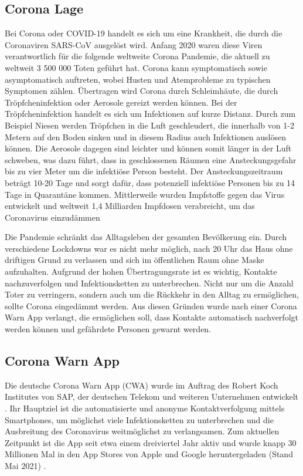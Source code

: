 \documentclass[conference]{IEEEtran}
\begin{document}
\subsection{Corona Lage}
Bei Corona oder COVID-19 handelt es sich um eine Krankheit, die durch die Coronaviren SARS-CoV ausgelöst wird. 
Anfang 2020 waren diese Viren verantwortlich für die folgende weltweite Corona Pandemie, die aktuell zu weltweit 3 500 000 Toten geführt hat. 
Corona kann symptomatisch sowie asymptomatisch auftreten, wobei Husten und Atemprobleme zu typischen Symptomen zählen.
Übertragen wird Corona durch Schleimhäute, die durch Tröpfcheninfektion oder Aerosole gereizt werden können.
Bei der Tröpfcheninfektion handelt es sich um Infektionen auf kurze Distanz. Durch zum Beispiel Niesen werden Tröpfchen in die Luft geschleudert, 
die innerhalb von 1-2 Metern auf den Boden sinken und in diesem Radius auch Infektionen auslösen können. 
Die Aerosole dagegen sind leichter und können somit länger in der Luft schweben, 
was dazu führt, dass in geschlossenen Räumen eine Ansteckungsgefahr bis zu vier Meter um die infektiöse Person besteht. 
Der Ansteckungszeitraum beträgt 10-20 Tage und sorgt dafür, dass potenziell infektiöse Personen bis zu 14 Tage in Quarantäne kommen.
Mittlerweile wurden Impfstoffe gegen das Virus entwickelt und weltweit 1,4 Milliarden Impfdosen verabreicht, um das Coronavirus einzudämmen

Die Pandemie schränkt das Alltagsleben der gesamten Bevölkerung ein. 
Durch verschiedene Lockdowns war es nicht mehr möglich, nach 20 Uhr das Haus ohne driftigen Grund zu verlassen und sich im öffentlichen Raum ohne Maske aufzuhalten. 
Aufgrund der hohen Übertragungsrate ist es wichtig, Kontakte nachzuverfolgen und Infektionsketten zu unterbrechen.
Nicht nur um die Anzahl Toter zu verringern, sondern auch um die Rückkehr in den Alltag zu ermöglichen, sollte Corona eingedämmt werden.
Aus diesen Gründen wurde nach einer Corona Warn App verlangt, die ermöglichen soll, dass Kontakte automatisch nachverfolgt werden können und gefährdete Personen gewarnt werden.

\subsection{Corona Warn App}
Die deutsche \glqq Corona Warn App\grqq{} (CWA) wurde im Auftrag des Robert Koch Institutes von SAP, der deutschen Telekom und weiteren Unternehmen entwickelt \cite{CWA}. 
Ihr Hauptziel ist die automatisierte und anonyme Kontaktverfolgung mittels Smartphones, um möglichst viele Infektionsketten zu unterbrechen und die Ausbreitung des Coronavirus weitmöglichst zu verlangsamen. 
Zum aktuellen Zeitpunkt ist die App seit etwa einem dreiviertel Jahr aktiv und  wurde knapp 30 Millionen Mal in den App Stores von Apple und Google heruntergeladen (Stand Mai 2021) \cite{Downloads}.
\end{document}
